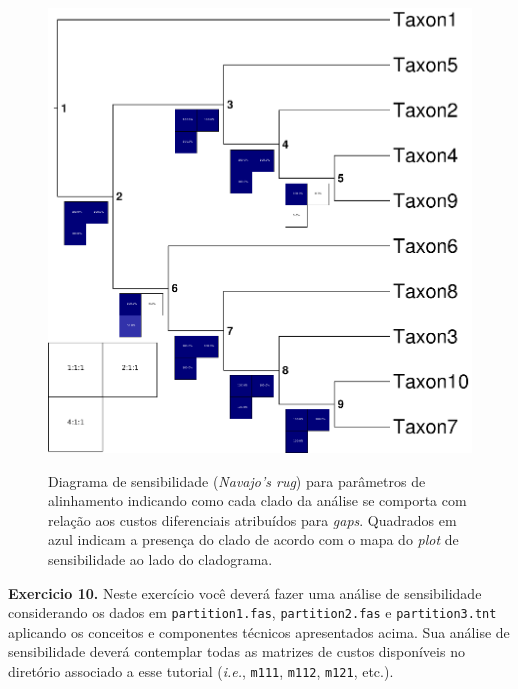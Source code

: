 \begin{refsection}
  \begin{figure}[H]
       \centering
      {\includegraphics[scale=0.9]{figures/tut10/sensibilidade.eps}}
	{\caption[Diagrama de sensibilidade (\textit{Navajo's rug}) para parâmetros de alinhamento.]{Diagrama de sensibilidade (\textit{Navajo's rug}) para parâmetros de alinhamento indicando como cada clado da análise se comporta com relação aos custos diferenciais atribuídos para \textit{gaps}. Quadrados em azul indicam a presença do clado de acordo com o mapa do \textit{plot} de sensibilidade ao lado do cladograma.}\label{tut10:fig:sensitivity}}
  \end{figure}


\begin{blackBlock}{\textbf{Exercicio 10.}}\label{tut10:ex:10.1}
Neste exercício você deverá fazer uma análise de sensibilidade considerando os dados em \texttt{partition1.fas}, \texttt{partition2.fas} e \texttt{partition3.tnt} aplicando os conceitos e componentes técnicos apresentados acima. Sua análise de sensibilidade deverá contemplar todas as matrizes de custos disponíveis no diretório associado a esse tutorial (\textit{i.e.}, \texttt{m111}, \texttt{m112}, \texttt{m121}, etc.).


\end{blackBlock}
\end{refsection}
